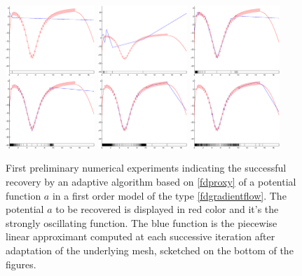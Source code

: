 \documentclass[A4paper,11pt]{article}
\theoremstyle{definition}
\begin{document}
\begin{figure}[h]
\begin{center}
 \includegraphics[width=0.3\textwidth]{Figure1}
\includegraphics[width=0.3\textwidth]{Figure3}
\includegraphics[width=0.3\textwidth]{Figure5}
\includegraphics[width=0.3\textwidth]{Figure7}
\includegraphics[width=0.3\textwidth]{Figure9}
\includegraphics[width=0.3\textwidth]{Figure11} 
\end{center}
\caption{First preliminary numerical experiments indicating the successful recovery by an adaptive algorithm based on \eqref{fdproxy} of a potential function $a$ in a first order model of the type \eqref{fdgradientflow}. The potential $a$ to be recovered is displayed in red color and it's the strongly oscillating function. The blue function is the piecewise linear approximant computed at each successive iteration after adaptation of the underlying mesh, scketched on the bottom of the figures.}\label{firstnum}
\end{figure}
\end{document}
